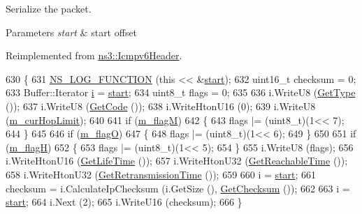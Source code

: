 Serialize the packet. 


\begin{DoxyParams}{Parameters}
{\em start} & start offset \\
\hline
\end{DoxyParams}


Reimplemented from \hyperlink{classns3_1_1Icmpv6Header_a730861c09bbcc03f586a7b31656cbbc5}{ns3\+::\+Icmpv6\+Header}.


\begin{DoxyCode}
630 \{
631   \hyperlink{log-macros-disabled_8h_a90b90d5bad1f39cb1b64923ea94c0761}{NS\_LOG\_FUNCTION} (\textcolor{keyword}{this} << &\hyperlink{namespacevisualizer_1_1core_a2a35e5d8a34af358b508dac8635754e0}{start});
632   uint16\_t checksum = 0;
633   Buffer::Iterator \hyperlink{bernuolliDistribution_8m_a6f6ccfcf58b31cb6412107d9d5281426}{i} = \hyperlink{namespacevisualizer_1_1core_a2a35e5d8a34af358b508dac8635754e0}{start};
634   uint8\_t flags = 0;
635 
636   i.WriteU8 (\hyperlink{classns3_1_1Icmpv6Header_a739eb76b792c840e9729110cb9d3ba1d}{GetType} ());
637   i.WriteU8 (\hyperlink{classns3_1_1Icmpv6Header_a0a66ddd5032075acb43d43677c343496}{GetCode} ());
638   i.WriteHtonU16 (0);
639   i.WriteU8 (\hyperlink{classns3_1_1Icmpv6RA_ab7b02456d8db642dc6923fbe8b970689}{m\_curHopLimit});
640 
641   \textcolor{keywordflow}{if} (\hyperlink{classns3_1_1Icmpv6RA_a162a725afd280e438c8c87ff5991aafd}{m\_flagM})
642     \{
643       flags |= (uint8\_t)(1<< 7);
644     \}
645 
646   \textcolor{keywordflow}{if} (\hyperlink{classns3_1_1Icmpv6RA_a2fe5497dfcc81cdb2a1cbe7e81c7c9b1}{m\_flagO})
647     \{
648       flags |= (uint8\_t)(1<< 6);
649     \}
650 
651   \textcolor{keywordflow}{if} (\hyperlink{classns3_1_1Icmpv6RA_ae67d2ed36a1b6ee63827af46687fc6fb}{m\_flagH})
652     \{
653       flags |= (uint8\_t)(1<< 5);
654     \}
655   i.WriteU8 (flags);
656   i.WriteHtonU16 (\hyperlink{classns3_1_1Icmpv6RA_a2a81d15062d9649803ba186e49fafd74}{GetLifeTime} ());
657   i.WriteHtonU32 (\hyperlink{classns3_1_1Icmpv6RA_ad9a6f8b78073b3573880384bf1e84af7}{GetReachableTime} ());
658   i.WriteHtonU32 (\hyperlink{classns3_1_1Icmpv6RA_aef44b3dec436b433cb092358b805b6ce}{GetRetransmissionTime} ());
659 
660   i = \hyperlink{namespacevisualizer_1_1core_a2a35e5d8a34af358b508dac8635754e0}{start};
661   checksum = i.CalculateIpChecksum (i.GetSize (), \hyperlink{classns3_1_1Icmpv6Header_a94c5bd0503cfd705ff2c93eb57fd1a75}{GetChecksum} ());
662 
663   i = \hyperlink{namespacevisualizer_1_1core_a2a35e5d8a34af358b508dac8635754e0}{start};
664   i.Next (2);
665   i.WriteU16 (checksum);
666 \}
\end{DoxyCode}



